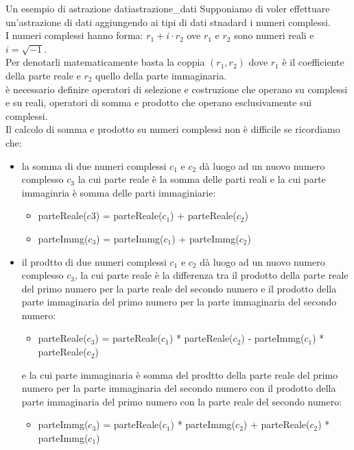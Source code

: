 \documentclass[12pt]{report}
\newcommand{\nmu}{}
\begin{document}
	\begin{example}{\nmu Un esempio di astrazione dati}{astrazione_dati}
		Supponiamo di voler effettuare un'astrazione di dati aggiungendo ai tipi di dati stnadard i numeri complessi. \\
		I numeri complessi hanno forma: $r_1 + i \cdot r_2$ ove $r_1$ e $r_2$ sono numeri reali e $i = \sqrt{-1}$. \\
		Per denotarli matematicamente basta la coppia $(r_1, r_2)$ dove $r_1$ è il coefficiente della parte reale e $r_2$ quello della parte immaginaria. \\
		è necessario definire operatori di selezione e costruzione che operano su complessi e su reali, operatori di somma e prodotto che operano esclusivamente sui complessi. \\
		Il calcolo di somma e prodotto su numeri complessi non è difficile se ricordiamo che:
		\begin{itemize}
			\item la somma di due numeri complessi $c_1$ e $c_2$ dà luogo ad un nuovo numero complesso $c_3$ la cui parte reale è la somma delle parti reali e la cui parte immaginria è somma delle parti immaginiarie:
			\begin{itemize}
				\item parteReale($c3$) = parteReale($c_1$) + parteReale($c_2$)
				\item parteImmg($c_3$) = parteImmg($c_1$) + parteImmg($c_2$)
			\end{itemize}
			\item il prodtto di due numeri complessi $c_1$ e $c_2$ dà luogo ad un nuovo numero complesso $c_3$, la cui parte reale è la differenza tra il prodotto della parte reale del primo numero per la parte reale del secondo numero e il prodotto della parte immaginaria del primo numero per la parte immaginaria del secondo numero:
			\begin{itemize}
				\item parteReale($c_3$) = parteReale($c_1$) * parteReale($c_2$) - parteImmg($c_1$) * parteReale($c_2$)
			\end{itemize}
			e la cui parte immaginaria è somma del prodtto della parte reale del primo numero per la parte immaginaria del secondo numero con il prodotto della parte immaginaria del primo numero con la parte reale del secondo numero:
			\begin{itemize}
				\item parteImmg($c_3$) = parteReale($c_1$) * parteImmg($c_2$) + parteReale($c_2$) * parteImmg($c_1$)

\end{itemize}
\end{itemize}
\end{example}
\end{document}
